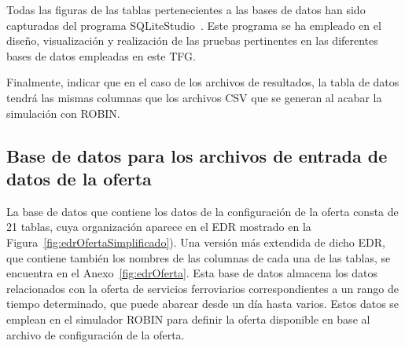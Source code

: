 Todas las figuras de las tablas pertenecientes a las bases de datos han sido capturadas del programa SQLiteStudio~\cite{SQLiteStudio}. Este programa se ha empleado en el diseño, visualización y realización de las pruebas pertinentes en las diferentes bases de datos empleadas en este \acrshort{TFG}.

Finalmente, indicar que en el caso de los archivos de resultados, la tabla de datos tendrá las mismas columnas que los archivos \acrshort{CSV} que se generan al acabar la simulación con \acrshort{ROBIN}.

\subsection{Base de datos para los archivos de entrada de datos de la oferta}
\label{subsec:dBSupply}

La base de datos que contiene los datos de la configuración de la oferta consta de 21 tablas, cuya organización aparece en el \acrfull{EDR} mostrado en la Figura~\ref{fig:edrOfertaSimplificado}). Una versión más extendida de dicho \acrshort{EDR}, que contiene también los nombres de las columnas de cada una de las tablas, se encuentra  en el Anexo~\ref{fig:edrOferta}. Esta base de datos almacena los datos relacionados con la oferta de servicios ferroviarios correspondientes a un rango de tiempo determinado, que puede abarcar desde un día hasta varios. Estos datos se emplean en el simulador \acrshort{ROBIN} para definir la oferta disponible en base al archivo de configuración de la oferta.

